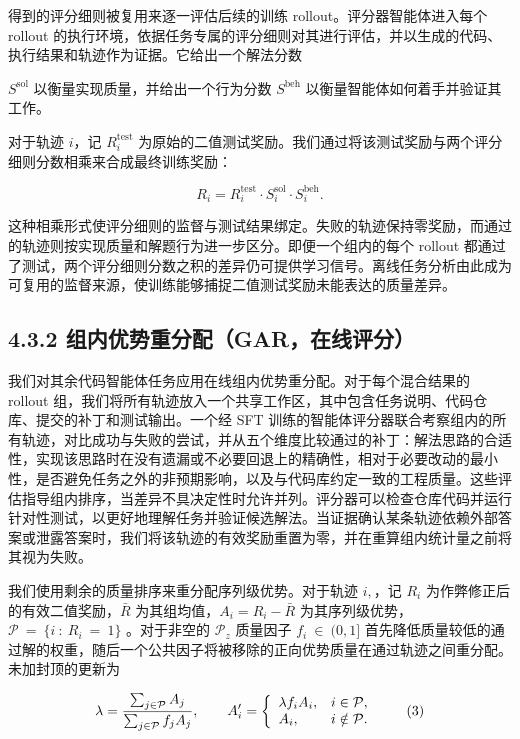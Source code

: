 得到的评分细则被复用来逐一评估后续的训练 rollout。评分器智能体进入每个 rollout 的执行环境，依据任务专属的评分细则对其进行评估，并以生成的代码、执行结果和轨迹作为证据。它给出一个解法分数


\(S ^ { \mathrm { s o l } }\) 以衡量实现质量，并给出一个行为分数 \(S ^ { \mathrm { b e h } }\) 以衡量智能体如何着手并验证其工作。

对于轨迹 $i$，记 \(R _ { i } ^ { \mathrm { t e s t } }\) 为原始的二值测试奖励。我们通过将该测试奖励与两个评分细则分数相乘来合成最终训练奖励：

\[
R _ { i } = R _ { i } ^ { \mathrm { t e s t } } \cdot S _ { i } ^ { \mathrm { s o l } } \cdot S _ { i } ^ { \mathrm { b e h } } .\tag{2}
\]

这种相乘形式使评分细则的监督与测试结果绑定。失败的轨迹保持零奖励，而通过的轨迹则按实现质量和解题行为进一步区分。即便一个组内的每个 rollout 都通过了测试，两个评分细则分数之积的差异仍可提供学习信号。离线任务分析由此成为可复用的监督来源，使训练能够捕捉二值测试奖励未能表达的质量差异。

\subsection{4.3.2 组内优势重分配（GAR，在线评分）}\label{groupwise-advantage-redistribution-gar-online-grading}

我们对其余代码智能体任务应用在线组内优势重分配。对于每个混合结果的 rollout 组，我们将所有轨迹放入一个共享工作区，其中包含任务说明、代码仓库、提交的补丁和测试输出。一个经 SFT 训练的智能体评分器联合考察组内的所有轨迹，对比成功与失败的尝试，并从五个维度比较通过的补丁：解法思路的合适性，实现该思路时在没有遗漏或不必要回退上的精确性，相对于必要改动的最小性，是否避免任务之外的非预期影响，以及与代码库约定一致的工程质量。这些评估指导组内排序，当差异不具决定性时允许并列。评分器可以检查仓库代码并运行针对性测试，以更好地理解任务并验证候选解法。当证据确认某条轨迹依赖外部答案或泄露答案时，我们将该轨迹的有效奖励重置为零，并在重算组内统计量之前将其视为失败。

我们使用剩余的质量排序来重分配序列级优势。对于轨迹 \(i ,\)，记 \(R _ { i }\) 为作弊修正后的有效二值奖励，$\bar{R}$ 为其组均值，\(A _ { i } = R _ { i } - \bar { R }\) 为其序列级优势，\(\mathcal { P } \ = \ \{ i \ : \ R _ { i } \ = \ 1 \}\) 。对于非空的 \(\mathcal { P } _ { z }\) 质量因子 \(f _ { i } ~ \in ~ ( 0 , 1 ]\) 首先降低质量较低的通过解的权重，随后一个公共因子将被移除的正向优势质量在通过轨迹之间重分配。未加封顶的更新为

\[
\lambda = \frac { \sum _ { j \in \mathcal { P } } A _ { j } } { \sum _ { j \in \mathcal { P } } f _ { j } A _ { j } } , \qquad A _ { i } ^ { \prime } = \left\{ \begin{array} { l l } { \lambda f _ { i } A _ { i } , } & { i \in \mathcal { P } , } \\ { A _ { i } , } & { i \notin \mathcal { P } . } \end{array} \right.\tag{3}
\]

